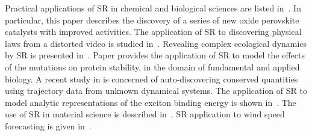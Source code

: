 \documentclass{bmcart}
\begin{document}
Practical applications of SR in chemical and biological sciences are listed in~\cite{weng2020simple}. In particular, this paper describes the discovery of a series of new oxide perovskite catalysts with improved activities. The application of SR to discovering physical laws from a distorted video is studied in~\cite{udrescu2021symbolic}. Revealing complex ecological dynamics by SR is presented in~\cite{chen2019revealing}. Paper \cite{louis2021reviewing} provides the application of SR to model the effects of the mutations on protein stability, in the domain of fundamental and applied biology. A recent study in \cite{liu2021machine} is concerned of auto-discovering conserved quantities using trajectory data from unknown dynamical systems. The application of SR to model analytic representations of the exciton binding energy is shown in~\cite{liang2019phillips}. The use of SR in material science is described in~\cite{wang2019symbolic,wang2022symbolic,burlacu2022symbolic,kabliman2021application}. SR application to wind speed forecasting is given in~\cite{abdellaoui2021symbolic}. 
\end{document}
